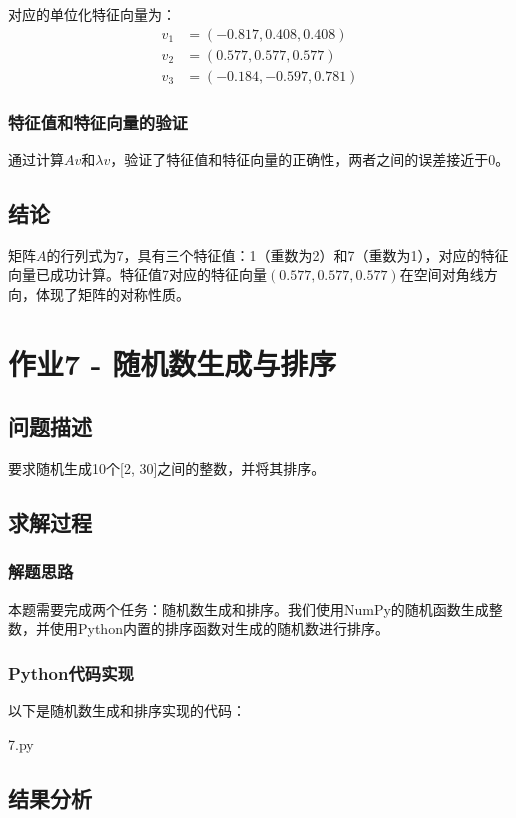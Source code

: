 \documentclass[bwprint]{cumcmthesis}
\begin{document}
对应的单位化特征向量为：
\begin{align}
v_1 &= (-0.817, 0.408, 0.408) \\
v_2 &= (0.577, 0.577, 0.577) \\
v_3 &= (-0.184, -0.597, 0.781)
\end{align}

\subsubsection{特征值和特征向量的验证}
通过计算$Av$和$\lambda v$，验证了特征值和特征向量的正确性，两者之间的误差接近于0。

\subsection{结论}
矩阵$A$的行列式为7，具有三个特征值：1（重数为2）和7（重数为1），对应的特征向量已成功计算。特征值7对应的特征向量$(0.577, 0.577, 0.577)$在空间对角线方向，体现了矩阵的对称性质。

\section{作业7 - 随机数生成与排序}

\subsection{问题描述}
要求随机生成10个[2, 30]之间的整数，并将其排序。

\subsection{求解过程}

\subsubsection{解题思路}
本题需要完成两个任务：随机数生成和排序。我们使用NumPy的随机函数生成整数，并使用Python内置的排序函数对生成的随机数进行排序。

\subsubsection{Python代码实现}
以下是随机数生成和排序实现的代码：

\noindent 7.py
    

\subsection{结果分析}
\end{document}
